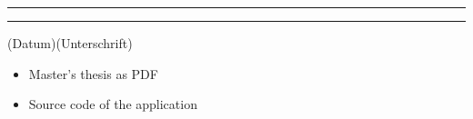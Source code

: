 \documentclass
[
	12pt,
	english,
	listof=totoc,
	bibliography=totoc,
	parskip,
]{scrartcl}
\begin{document}
\vspace{5em}

\rule{.3\textwidth}{.5pt}\qquad\rule{.45\textwidth}{.5pt}

\vspace{-1em}		
\hspace{3.5em}(Datum)\hspace{10,5em}(Unterschrift)


\label{sec:Inhalt-USB}
\begin{itemize}
    \item Master's thesis as PDF
    \item Source code of the application
\end{itemize}

\end{document}
